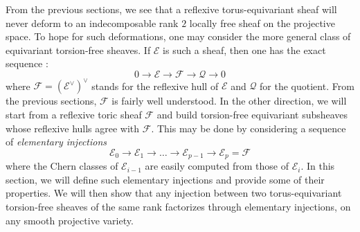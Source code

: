 \documentclass[a4paper,10pt]{amsart}
\theoremstyle{plain}{
    \newtheorem{theorem}{Theorem}[section]
    \newtheorem{lemma}[theorem]{Lemma}
    \newtheorem{corollary}[theorem]{Corollary}
    \newtheorem{proposition}[theorem]{Proposition}
    \newtheorem{conjecture}[theorem]{Conjecture}
}
\theoremstyle{definition}{
    \newtheorem{definition}[theorem]{Definition}
    \newtheorem{defn-thm}[theorem]{Definition-Theorem}
    \newtheorem{example}[theorem]{Example}
    \newtheorem{notation}[theorem]{Notation}
}
\theoremstyle{remark}{
    \newtheorem{remark}[theorem]{Remark}
    \newtheorem{problem}[theorem]{Problem}
    \newtheorem{question}[theorem]{Question}
}
\def\cF{\mathcal{F}}
\def\cE{\mathcal{E}}
\def\cQ{\mathcal{Q}}
\begin{document}
From the previous sections, we see that a reflexive torus-equivariant sheaf will never deform to an indecomposable rank $2$ locally free sheaf on the projective space. To hope for such deformations, one may consider the more general class of equivariant torsion-free sheaves. If $\cE$ is such a sheaf, then one has the exact sequence :
$$
0\to \cE \to \cF\to \cQ\to 0
$$
where $\cF=(\cE^\vee)^\vee$ stands for the reflexive hull of $\cE$ and $\cQ$ for the quotient. From the previous sections, $\cF$ is fairly well understood. In the other direction, we will start from a reflexive toric sheaf $\cF$ and build torsion-free equivariant subsheaves whose reflexive hulls agree with $\cF$. This may be done by considering a sequence of {\it elementary injections} 
$$\cE_0\to\cE_1\to \ldots\to \cE_{p-1}\to\cE_p=\cF$$
where the Chern classes of $\cE_{i-1}$ are easily computed from those of $\cE_i$. In this section, we will define such elementary injections and provide some of their properties. We will then show that any injection between two torus-equivariant torsion-free sheaves of the same rank factorizes through elementary injections, on any smooth projective variety.
\end{document}
